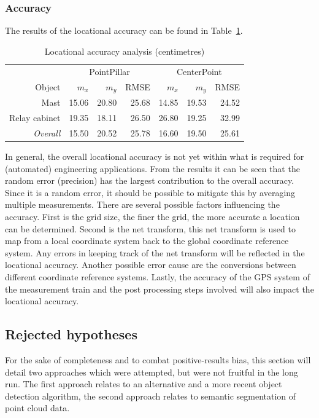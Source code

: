 \subsubsection{Accuracy}
The results of the locational accuracy can be found in Table~\ref{tbl:objdet:locacc}.
\begin{table}[ht]
    \centering
    \begin{tabular}{rrrrrrr}
        \toprule
        & \multicolumn{3}{c}{PointPillar} & \multicolumn{3}{c}{CenterPoint}\\
        \cmidrule(lr){2-4} \cmidrule(lr){5-7}
        Object & $m_x$ & $m_y$ & RMSE & $m_x$ & $m_y$ & RMSE \\
        \midrule
        Mast & 15.06 & 20.80 &  25.68 & 14.85 & 19.53 & 24.52 \\
        Relay cabinet & 19.35 & 18.11 & 26.50 & 26.80 & 19.25 & 32.99 \\
        \midrule
        \textit{Overall} & 15.50 & 20.52 & 25.78 & 16.60 & 19.50 & 25.61 \\
        \bottomrule
    \end{tabular}
    \caption{Locational accuracy analysis (centimetres)} %
    \label{tbl:objdet:locacc}
\end{table}

In general, the overall locational accuracy is not yet within what is required for (automated) engineering applications. From the results it can be seen that the random error (precision) has the largest contribution to the overall accuracy. Since it is a random error, it should be possible to mitigate this by averaging multiple measurements. There are several possible factors influencing the accuracy. First is the grid size, the finer the grid, the more accurate a location can be determined. Second is the net transform, this net transform is used to map from a local coordinate system back to the global coordinate reference system. Any errors in keeping track of the net transform will be reflected in the locational accuracy. Another possible error cause are the conversions between different coordinate reference systems. Lastly, the accuracy of the GPS system of the measurement train and the post processing steps involved will also impact the locational accuracy. 

\subsection{Rejected hypotheses}
For the sake of completeness and to combat positive-results bias, this section will detail two approaches which were attempted, but were not fruitful in the long run. The first approach relates to an alternative and a more recent object detection algorithm, the second approach relates to semantic segmentation of point cloud data.

